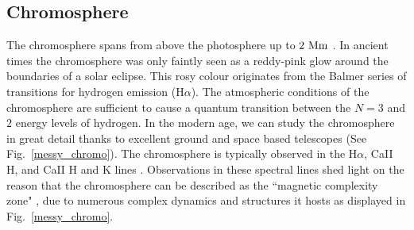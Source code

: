 \subsection{Chromosphere}
\label{ssec:Chromosphere}
The chromosphere spans from above the photosphere up to $2~\rm{Mm}$ \citep{Lang_2006ses}. In ancient times the chromosphere was only faintly seen as a reddy-pink glow around the boundaries of a solar eclipse. This rosy colour originates from the Balmer series of transitions for hydrogen emission (H$\alpha$). The atmospheric conditions of the chromosphere are sufficient to cause a quantum transition between the $N=3$ and $2$ energy levels of hydrogen. In the modern age, we can study the chromosphere in great detail thanks to excellent ground and space based telescopes (See Fig.~\ref{messy_chromo}). The chromosphere is typically observed in the H$\alpha$, CaII H, and CaII H and K lines \citep{Ayres2019sgspbook27A}. Observations in these spectral lines shed light on the reason that the chromosphere can be described as the ``magnetic complexity zone" \citep{Ayres2009astro2010S9A}, due to numerous complex dynamics and structures it hosts as displayed in Fig.~\ref{messy_chromo}. \np  
